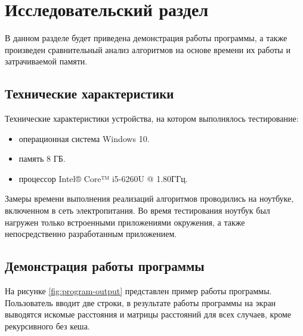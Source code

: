\section{Исследовательский раздел \hfill}
\vspace{\baselineskip}

В данном разделе будет приведена демонстрация работы программы, а также произведен сравнительный анализ алгоритмов на основе времени их работы и затрачиваемой памяти.

\subsection{Технические характеристики}

Технические характеристики устройства, на котором выполнялось тестирование:

\begin{itemize}
	\item операционная система Windows 10.
	\item память 8 ГБ.
	\item процессор Intel® Core™ i5-6260U @ 1.80ГГц.
\end{itemize}

Замеры времени выполнения реализаций алгоритмов проводились на ноутбуке, включенном в сеть электропитания. Во время тестирования ноутбук был нагружен только встроенными приложениями окружения, а также непосредственно разработанным приложением.

\subsection{Демонстрация работы программы}

На рисунке \ref{fig:program-output} представлен пример работы программы. Пользователь вводит две строки, в результате работы программы на экран выводятся искомые расстояния и матрицы расстояний для всех случаев, кроме рекурсивного без кеша.
\clearpage

